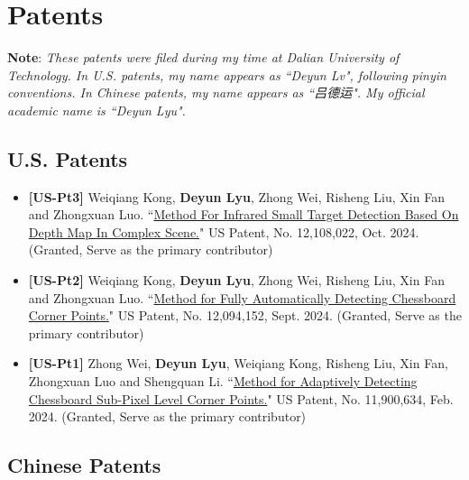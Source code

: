 \documentclass[11pt,a4paper]{moderncv}        %
\begin{document}
\section{Patents}
\hypertarget{sec:patents}{}
\noindent \textbf{Note}: \textit{These patents were filed during my time at Dalian University of Technology. In U.S. patents, my name appears as ``Deyun Lv", following pinyin conventions. In Chinese patents, my name appears as ``吕德运". My official academic name is ``Deyun Lyu".}

\subsection{U.S. Patents}
\begin{itemize}
    \item \textbf{[US-Pt3]} Weiqiang Kong, \textbf{Deyun Lyu}, Zhong Wei, Risheng Liu, Xin Fan and Zhongxuan Luo. ``\href{https://patents.google.com/patent/US20220174256A1/en}{Method For Infrared Small Target Detection Based On Depth Map In Complex Scene.}" US Patent, No. 12,108,022, Oct. 2024. (Granted, Serve as the primary contributor)
    \item \textbf{[US-Pt2]} Weiqiang Kong, \textbf{Deyun Lyu}, Zhong Wei, Risheng Liu, Xin Fan and Zhongxuan Luo. ``\href{https://patents.google.com/patent/US20220148213A1/en}{Method for Fully Automatically Detecting Chessboard Corner Points.}" US Patent, No. 12,094,152, Sept. 2024. (Granted, Serve as the primary contributor)
    \item \textbf{[US-Pt1]} Zhong Wei, \textbf{Deyun Lyu}, Weiqiang Kong, Risheng Liu, Xin Fan, Zhongxuan Luo and Shengquan Li. ``\href{https://patents.google.com/patent/US11900634B2/en}{Method for Adaptively Detecting Chessboard Sub-Pixel Level Corner Points.}" US Patent, No. 11,900,634, Feb. 2024. (Granted, Serve as the primary contributor)
\end{itemize}

\subsection{Chinese Patents}
\end{document}
